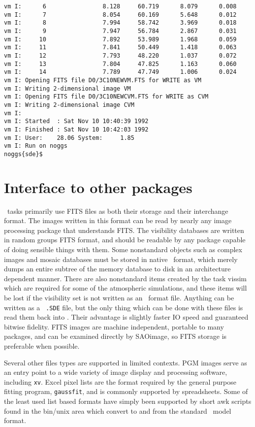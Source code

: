\begin{verbatim}
vm I:      6                8.128     60.719      8.079      0.008
vm I:      7                8.054     60.169      5.648      0.012
vm I:      8                7.994     58.742      3.969      0.018
vm I:      9                7.947     56.784      2.867      0.031
vm I:     10                7.892     53.989      1.968      0.059
vm I:     11                7.841     50.449      1.418      0.063
vm I:     12                7.793     48.220      1.037      0.072
vm I:     13                7.804     47.825      1.163      0.060
vm I:     14                7.789     47.749      1.006      0.024
vm I: Opening FITS file D0/3C10NEWVM.FTS for WRITE as VM
vm I: Writing 2-dimensional image VM
vm I: Opening FITS file D0/3C10NEWCVM.FTS for WRITE as CVM
vm I: Writing 2-dimensional image CVM
vm I:
vm I: Started  : Sat Nov 10 10:40:39 1992
vm I: Finished : Sat Nov 10 10:42:03 1992
vm I: User:    28.06 System:     1.85
vm I: Run on noggs
noggs{sde}$ 
\end{verbatim}

\newpage
\section{Interface to other packages}

\sde\ tasks primarily use FITS files as both their storage and their
interchange format.  The images written in this format can be read by
nearly any image processing package that understands FITS.  The
visibility databases are written in random groups FITS format, and
should be readable by any package capable of doing sensible things
with them.  Some nonstandard objects such as complex images and mosaic
databases must be stored in native \sde\ format, which merely dumps an
entire subtree of the memory database to disk in an architecture
dependent manner.  There are also nonstandard items created by the
task vissim which are required for some of the atmospheric
simulations, and these items will be lost if the visibility set is not
written as an \sde\ format file.  Anything can be written as a {\tt
.SDE} file, but the only thing which can be done with these files is
read them back into \sde.  Their advantage is slightly faster IO speed
and guaranteed bitwise fidelity.  FITS images are machine independent,
portable to many packages, and can be examined directly by SAOimage,
so FITS storage is preferable when possible.

Several other files types are supported in limited contexts.  PGM images
serve as an entry point to a wide variety of image display and processing
software, including {\tt xv}.  Excel pixel lists are the format required
by the general purpose fitting program, {\tt gaussfit}, and is commonly
supported by spreadsheets.  Some of the least used list based formats have
simply been supported by short awk scripts found in the bin/unix area
which convert to and from the standard \sde\ model format.

